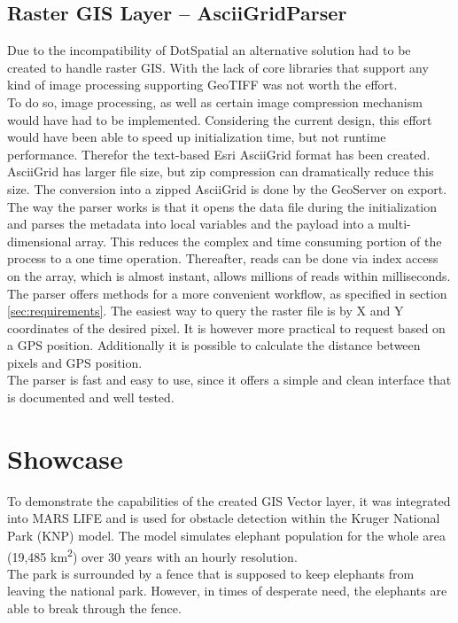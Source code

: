 \subsection{Raster GIS Layer -- AsciiGridParser}
\label{sec:parser}
Due to the incompatibility of DotSpatial an alternative solution had to be created to handle raster GIS. With the lack of core libraries that support any kind of image processing supporting GeoTIFF was not worth the effort.\\
To do so, image processing, as well as certain image compression mechanism would have had to be implemented. Considering the current design, this effort would have been able to speed up initialization time, but not runtime performance. Therefor the text-based Esri AsciiGrid format has been created.\\
AsciiGrid has larger file size, but zip compression can dramatically reduce this size. The conversion into a zipped AsciiGrid is done by the GeoServer on export.\\
The way the parser works is that it opens the data file during the initialization and parses the metadata into local variables and the payload into a multi-dimensional array. This reduces the complex and time consuming portion of the process to a one time operation. Thereafter, reads can be done via index access on the array, which is almost instant, allows millions of reads within milliseconds.\\
The parser offers methods for a more convenient workflow, as specified in section \ref{sec:requirements}. The easiest way to query the raster file is by X and Y coordinates of the desired pixel. It is however more practical to request based on a GPS position. Additionally it is possible to calculate the distance between pixels and GPS position.\\
The parser is fast and easy to use, since it offers a simple and clean interface that is documented and well tested.


\section{Showcase}
To demonstrate the capabilities of the created GIS Vector layer, it was integrated into MARS LIFE and is used for obstacle detection within the Kruger National Park (KNP) model. The model simulates elephant population for the whole area (19,485 \si{km^{2}}) over 30 years with an hourly resolution.\\
The park is surrounded by a fence that is supposed to keep elephants from leaving the national park. However, in times of desperate need, the elephants are able to break through the fence.


